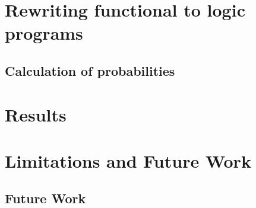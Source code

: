 \documentclass{acmsiggraph}
\begin{document}
\section{Rewriting functional to logic programs}



\subsection{Calculation of probabilities}


\section{Results}



\section{Limitations and Future Work}






\subsection{Future Work}

\end{document}
